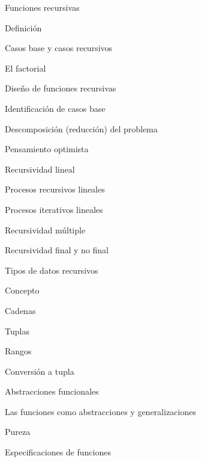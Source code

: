 \begin{longenum}
\begin{longenum}
\begin{longenum}
            \item Funciones recursivas
            \begin{longenum}
                \item Definición
                \item Casos base y casos recursivos
                \item El factorial
                \item Diseño de funciones recursivas
                \begin{longenum}
                    \item Identificación de casos base
                    \item Descomposición (reducción) del problema
                    \item Pensamiento optimista
                \end{longenum}
                \item Recursividad lineal
                \begin{longenum}
                    \item Procesos recursivos lineales \opcional\
                    \item Procesos iterativos lineales \opcional\
                \end{longenum}
                \item Recursividad múltiple
                \item Recursividad final y no final \opcional\
            \end{longenum}
            \item Tipos de datos recursivos
            \begin{longenum}
                \item Concepto
                \item Cadenas
                \item Tuplas
                \item Rangos
                \item Conversión a tupla
            \end{longenum}
        \end{longenum}
        \item Abstracciones funcionales
        \begin{longenum}
            \item Las funciones como abstracciones y generalizaciones
            \item Pureza
            \item Especificaciones de funciones

\end{longenum}
\end{longenum}
\end{longenum}
